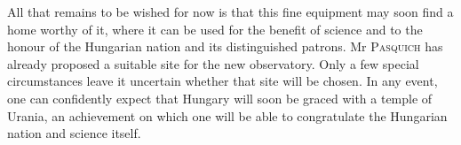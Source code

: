 All that remains to be wished for now is that this fine equipment may soon find a home worthy of it, where it can be used for the benefit of science and to the honour of the Hungarian nation and its distinguished patrons. Mr \textsc{Pasquich} has already proposed a suitable site for the new observatory. Only a few special circumstances leave it uncertain whether that site will be chosen. In any event, one can confidently expect that Hungary will soon be graced with a temple of Urania, an achievement on which one will be able to congratulate the Hungarian nation and science itself.
